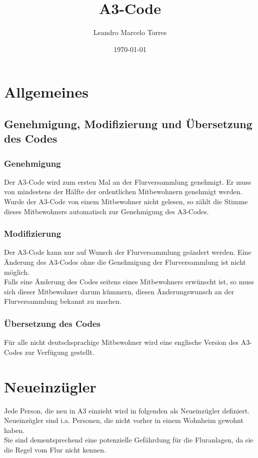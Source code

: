 \documentclass[10pt,a4paper,final]{article}
\author{Leandro Marcelo Torres}
\title{A3-Code}
\date{\today}
\begin{document}
\maketitle %
\thispagestyle{empty}
\cleardoublepage
\tableofcontents
\newpage
\section{Allgemeines}
\subsection{Genehmigung, Modifizierung und Übersetzung des Codes}
\subsubsection{Genehmigung}
Der A3-Code wird zum ersten Mal an der Flurversammlung genehmigt. Er muss von mindestens der Hälfte der ordentlichen Mitbewohnern genehmigt werden. Wurde der A3-Code von einem Mitbewohner nicht gelesen, so zählt die Stimme dieses Mitbewohners automatisch zur Genehmigung des A3-Codes. 
\subsubsection{Modifizierung}
Der A3-Code kann nur auf Wunsch der Flurversammlung geändert werden. Eine Änderung des A3-Codes ohne die Genehmigung der Flurversammlung ist nicht möglich.\\
Falls eine Änderung des Codes seitens eines Mitbewohners erwünscht ist, so muss sich dieser Mitbewohner darum kümmern, diesen Änderungswunsch an der Flurversammlung bekannt zu machen.
\subsubsection{Übersetzung des Codes}
Für alle nicht deutschsprachige Mitbewohner wird eine englische Version des A3-Codes zur Verfügung gestellt.\\
\section{Neueinzügler}
Jede Person, die neu in A3 einzieht wird in folgenden als Neueinzügler definiert.\\
Neueinzügler sind i.a. Personen, die nicht vorher in einem Wohnheim gewohnt haben.\\
Sie sind dementsprechend eine potenzielle Gefährdung für die Fluranlagen, da sie die Regel vom Flur nicht kennen.\\
\end{document}
